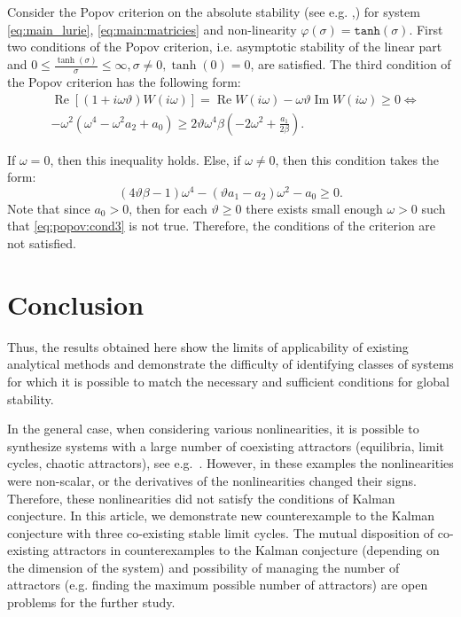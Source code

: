 \documentclass{ifacconf}
\theoremstyle{plain}
\begin{document}
Consider the Popov criterion on the absolute stability
(see e.g. \citep[p.~961]{Popov-1961},\cite[p.~79]{YakubovichLG-2004})
for system \eqref{eq:main_lurie}, \eqref{eq:main:matricies}
and non-linearity $\varphi(\sigma) = \texttt{tanh}(\sigma)$.
First two conditions of the Popov criterion, i.e. asymptotic stability of the linear part and
$0 \leq \frac{\tanh(\sigma)}{\sigma} \leq \infty, \sigma \neq 0, \tanh(0) = 0$, are satisfied.
The third condition of the Popov criterion has the following form:
\begin{equation*}\label{eq:popov}
	\begin{aligned}
		&\operatorname{Re}[(1+i\omega\vartheta)W(i\omega)] = \operatorname{Re}W(i\omega) - \omega\vartheta\operatorname{Im}W(i\omega) \geq 0 \Leftrightarrow \\
		&-\omega^2(\omega^4-\omega^2a_2+a_0) \geq 2\vartheta\omega^4\beta\left(-2\omega^2+\frac{a_1}{2\beta}\right).
	\end{aligned}
\end{equation*}

If $\omega = 0$, then this inequality holds.
Else, if $\omega \neq 0$, then this condition takes the form:
\begin{equation}\label{eq:popov:cond3}
		(4\vartheta\beta-1)\omega^4 - (\vartheta a_1 - a_2)\omega^2-a_0 \geq 0.
\end{equation}
Note that since $a_0 >0$, then for each $\vartheta \geq 0$ there exists small
enough $\omega > 0$ such that \eqref{eq:popov:cond3} is not true.
Therefore, the conditions of the criterion are not satisfied.

\section{Conclusion}

Thus, the results obtained here show the limits of applicability of existing analytical methods
and demonstrate the difficulty of identifying classes of systems for which
it is possible to match the necessary and sufficient conditions for global stability.

In the general case, when considering various nonlinearities, it is possible to synthesize
systems with a large number of coexisting attractors (equilibria, limit cycles, chaotic attractors),
see e.g.~\citep{WangC-2013,ZhangC-2017,StankevichKLC-2017,KuznetsovKLMS-2017-IFAC,ChenKLM-2017-IJBC}.
However, in these examples
the nonlinearities were non-scalar, or
the derivatives of the nonlinearities changed their signs.
Therefore, these nonlinearities did not satisfy the conditions of Kalman conjecture.
In this article, we demonstrate new counterexample to the Kalman conjecture with
three co-existing stable limit cycles.
The mutual disposition
of co-existing attractors in counterexamples to the Kalman conjecture
(depending on the dimension of the system)
and possibility of managing the number of attractors
(e.g. finding the maximum possible number of attractors)
are open problems for the further study.
\end{document}
